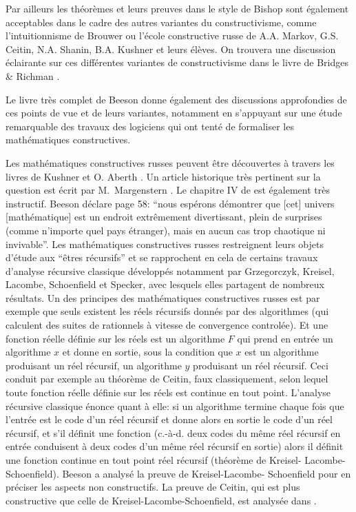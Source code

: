 Par ailleurs les théorèmes et leurs preuves dans le style de Bishop sont 
également acceptables dans le cadre des autres variantes du constructivisme, comme l'intuitionnisme de Brouwer ou l'école constructive russe de A.A. Markov, G.S. Ceitin, N.A. Shanin, B.A. Kushner et leurs élèves. On trouvera une discussion éclairante sur ces différentes variantes de constructivisme dans le livre de Bridges \& Richman 
\cite{fBR}. 

Le livre très complet de Beeson \cite{fBe} donne également des 
discussions approfondies de ces points de vue et de leurs variantes, notamment en s'appuyant sur une étude remarquable des travaux des logiciens qui ont tenté de formaliser les mathématiques constructives.  

Les mathématiques constructives russes peuvent être découvertes à 
travers les livres de Kushner \cite{fKu} et O. Aberth \cite{fAb}. Un article historique très pertinent sur la question est écrit par M.~Margenstern \cite{fMa}. 
Le chapitre IV de \cite{fBe} est également très instructif. Beeson déclare page 58: ``nous espérons démontrer que [cet] univers [mathématique] est un endroit extrêmement divertissant, plein de surprises (comme n'importe quel pays étranger), mais en aucun cas trop chaotique ni invivable''. Les mathématiques constructives russes restreignent leurs objets d'étude aux ``êtres récursifs'' et se rapprochent en cela de certains travaux d'analyse récursive classique développés 
notamment par Grzegorczyk, Kreisel, Lacombe, Schoenfield et Specker, avec 
lesquels elles partagent de nombreux résultats. Un des principes des mathématiques constructives russes est par exemple que seuls existent les réels récursifs donnés par des algorithmes (qui calculent des suites de rationnels à vitesse de convergence controlée). Et une fonction réelle définie sur les réels est un algorithme  $F$  qui prend en entrée un algorithme  $x$  et donne en sortie, sous la condition que  $x$  est un algorithme produisant un réel récursif, un algorithme  $y$  produisant un réel récursif. Ceci conduit par exemple au théorème de Ceitin, faux classiquement, selon lequel toute fonction réelle définie sur les réels est continue en tout point. 
L'analyse récursive classique énonce quant à elle: si un algorithme 
termine chaque fois que l'entrée est le code d'un réel récursif et donne 
alors en sortie le code d'un réel récursif, et s'il définit une fonction 
(c.-à-d. deux codes du même réel récursif en entrée conduisent à 
deux codes d'un même réel récursif en sortie) alors il définit une 
fonction continue en tout point réel récursif (théorème de Kreisel-
Lacombe-Schoenfield). Beeson a analysé la preuve de Kreisel-Lacombe-
Schoenfield pour en préciser les aspects non constructifs. La preuve de 
Ceitin, qui est plus constructive que celle de 
Kreisel-Lacombe-Schoenfield, est analysée dans \cite{fBR}.
 
